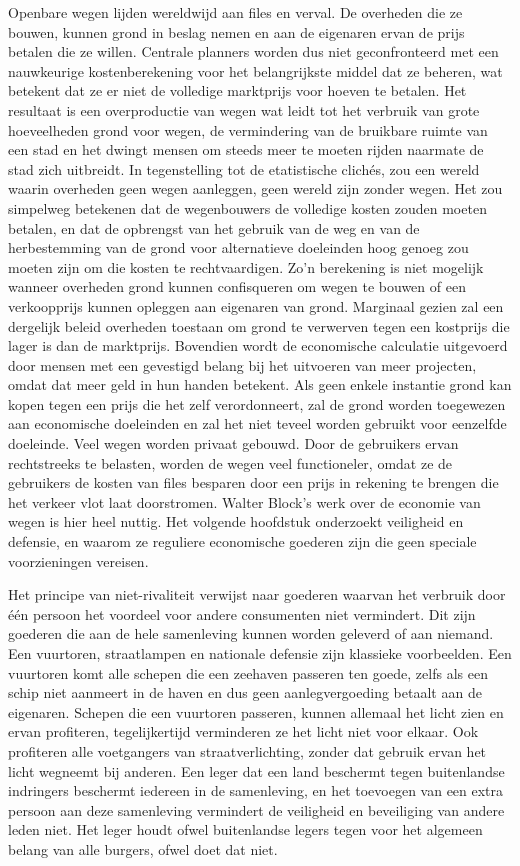 Openbare wegen lijden wereldwijd aan files en verval. De overheden die ze bouwen, kunnen grond in beslag nemen en aan de eigenaren ervan de prijs betalen die ze willen. Centrale planners worden dus niet geconfronteerd met een nauwkeurige kostenberekening voor het belangrijkste middel dat ze beheren, wat betekent dat ze er niet de volledige marktprijs voor hoeven te betalen. Het resultaat is een overproductie van wegen wat leidt tot het verbruik van grote hoeveelheden grond voor wegen, de vermindering van de bruikbare ruimte van een stad en het dwingt mensen om steeds meer te moeten rijden naarmate de stad zich uitbreidt. In tegenstelling tot de etatistische clichés, zou een wereld waarin overheden geen wegen aanleggen, geen wereld zijn zonder wegen. Het zou simpelweg betekenen dat de wegenbouwers de volledige kosten zouden moeten betalen, en dat de opbrengst van het gebruik van de weg en van de herbestemming van de grond voor alternatieve doeleinden hoog genoeg zou moeten zijn om die kosten te rechtvaardigen. Zo'n berekening is niet mogelijk wanneer overheden grond kunnen confisqueren om wegen te bouwen of een verkoopprijs kunnen opleggen aan eigenaren van grond. Marginaal gezien zal een dergelijk beleid overheden toestaan om grond te verwerven tegen een kostprijs die lager is dan de marktprijs. Bovendien wordt de economische calculatie uitgevoerd door mensen met een gevestigd belang bij het uitvoeren van meer projecten, omdat dat meer geld in hun handen betekent. Als geen enkele instantie grond kan kopen tegen een prijs die het zelf verordonneert, zal de grond worden toegewezen aan economische doeleinden en zal het niet teveel worden gebruikt voor eenzelfde doeleinde. Veel wegen worden privaat gebouwd. Door de gebruikers ervan rechtstreeks te belasten, worden de wegen veel functioneler, omdat ze de gebruikers de kosten van files besparen door een prijs in rekening te brengen die het verkeer vlot laat doorstromen. Walter Block's werk over de economie van wegen is hier heel nuttig.\autocite{191} Het volgende hoofdstuk onderzoekt veiligheid en defensie, en waarom ze reguliere economische goederen zijn die geen speciale voorzieningen vereisen.

Het principe van niet-rivaliteit verwijst naar goederen waarvan het verbruik door één persoon het voordeel voor andere consumenten niet vermindert. Dit zijn goederen die aan de hele samenleving kunnen worden geleverd of aan niemand. Een vuurtoren, straatlampen en nationale defensie zijn klassieke voorbeelden. Een vuurtoren komt alle schepen die een zeehaven passeren ten goede, zelfs als een schip niet aanmeert in de haven en dus geen aanlegvergoeding betaalt aan de eigenaren. Schepen die een vuurtoren passeren, kunnen allemaal het licht zien en ervan profiteren, tegelijkertijd verminderen ze het licht niet voor elkaar. Ook profiteren alle voetgangers van straatverlichting, zonder dat gebruik ervan het licht wegneemt bij anderen. Een leger dat een land beschermt tegen buitenlandse indringers beschermt iedereen in de samenleving, en het toevoegen van een extra persoon aan deze samenleving vermindert de veiligheid en beveiliging van andere leden niet. Het leger houdt ofwel buitenlandse legers tegen voor het algemeen belang van alle burgers, ofwel doet dat niet.


